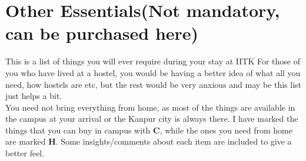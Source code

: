 \documentclass[11pt]{article}
\begin{document}
\section{Other Essentials(Not mandatory, can be purchased here)}
This is a list of things you will ever require during your stay at IITK \cite{entry:2}
For those of you who have lived at a hostel, you would be having a better idea of what all you need, how hostels are etc, but the rest would be very anxious and may be this list just helps a bit.\\
You need not bring everything from home, as most of the things are available in the campus at your arrival or the Kanpur city is always there. I have marked the things that you can buy in campus with \textbf{C}, while the ones you need from home are marked \textbf{H}. Some insights/comments about each item are included to give a better feel.
\end{document}
